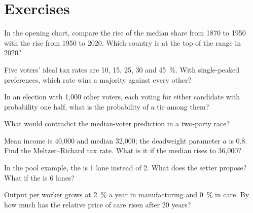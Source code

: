 \section{Exercises}\label{sec:b3:public-choice-voting:exercises}

\begin{exercise}[$\star$]\label{exo:b3:public-choice-voting:1}
In the opening chart, compare the rise of the median share from 1870 to 1950 with
the rise from 1950 to 2020. Which country is at the top of the range in 2020?
\end{exercise}

\begin{exercise}[$\star$]\label{exo:b3:public-choice-voting:2}
Five voters' ideal tax rates are 10, 15, 25, 30 and 45~\%. With single-peaked
preferences, which rate wins a majority against every other?
\end{exercise}

\begin{exercise}[$\star$]\label{exo:b3:public-choice-voting:3}
In an election with 1{,}000 other voters, each voting for either candidate with
probability one half, what is the probability of a tie among them?
\end{exercise}

\begin{exercise}[$\star$]\label{exo:b3:public-choice-voting:4}
What would contradict the median-voter prediction in a two-party race?
\end{exercise}

\begin{exercise}[$\star\star$]\label{exo:b3:public-choice-voting:5}
Mean income is 40{,}000 and median 32{,}000; the deadweight parameter $a$ is 0.8. Find the
Meltzer--Richard tax rate. What is it if the median rises to 36{,}000?
\end{exercise}

\begin{exercise}[$\star\star$]\label{exo:b3:public-choice-voting:6}
In the pool example, the  is 1 lane instead of 2. What does the setter
propose? What if the  is 6 lanes?
\end{exercise}

\begin{exercise}[$\star\star$]\label{exo:b3:public-choice-voting:7}
Output per worker grows at 2~\% a year in manufacturing and 0~\% in care. By how much has
the relative price of care risen after 20 years?
\end{exercise}

